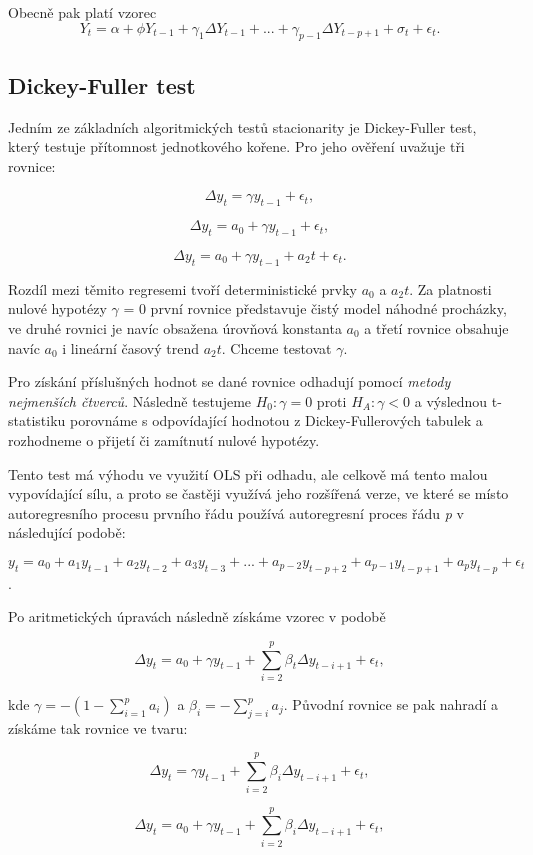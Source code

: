 \documentclass[thesis=M,czech]{FITthesis}[2022/10/08]
\begin{document}
Obecně pak platí vzorec
\[Y_t = \alpha + \phi Y_{t-1} + \gamma_1 \Delta Y_{t-1} + . . . + \gamma_{p−1}\Delta Y_{t-p+1} + \sigma_t + \epsilon_t.\]

\subsection{Dickey-Fuller test}
Jedním ze základních algoritmických testů stacionarity je Dickey-Fuller test, který testuje přítomnost jednotkového kořene. Pro jeho ověření uvažuje tři rovnice:

\[\Delta y_t = \gamma y_{t-1} + \epsilon_t,\] 

\[\Delta y_t = a_0 + \gamma y_{t-1} + \epsilon_t,\] 

\[\Delta y_t = a_0 + \gamma y_{t-1} +a_2 t + \epsilon_t.\]

Rozdíl mezi těmito regresemi tvoří deterministické prvky $a_0$ a $a_2t$. Za platnosti nulové hypotézy $\gamma$ = 0 první rovnice představuje čistý model náhodné procházky, ve druhé rovnici je navíc obsažena úrovňová konstanta $a_0$ a třetí rovnice obsahuje navíc $a_0$ i lineární časový trend $a_2t$. Chceme testovat $\gamma$.

Pro získání příslušných hodnot se dané rovnice odhadují pomocí \textit{metody nejmenších čtverců}. Následně testujeme $H_0: \gamma = 0$ proti $H_A: \gamma < 0$ a výslednou t-statistiku porovnáme s odpovídající hodnotou z Dickey-Fullerových tabulek a rozhodneme o přijetí či zamítnutí nulové hypotézy.

Tento test má výhodu ve využití OLS při odhadu, ale celkově má tento malou vypovídající sílu, a proto se častěji využívá jeho rozšířená verze, ve které se místo autoregresního procesu prvního řádu používá autoregresní proces řádu \textit{p} v následující podobě:

 \[y_t = a_0 + a_1y_{t-1} + a_2y_{t-2} + a_3y_{t-3} +...+ a_{p-2}y_{t-p+2} + a_{p-1}y_{t-p+1} + a_py_{t-p} + \epsilon_t\].
 
Po aritmetických úpravách následně získáme vzorec v podobě

\[\Delta y_t = a_0 + \gamma y_{t-1} + \sum_{i=2}^p \beta_t \Delta y_{t-i+1} + \epsilon_t,\]

 kde $\gamma = −(1−\sum_{i=1}^p a_i)$ a $\beta_i = −\sum_{j=i}^p a_j$. Původní rovnice se pak nahradí a získáme tak rovnice ve tvaru:
 
\[\Delta y_t = \gamma y_{t-1} + \sum_{i=2}^p \beta_i\Delta y_{t-i+1} + \epsilon_t,\] 

\[\Delta y_t = a_0 + \gamma y_{t-1} + \sum_{i=2}^p \beta_i\Delta y_{t-i+1} + \epsilon_t,\] 
\end{document}

